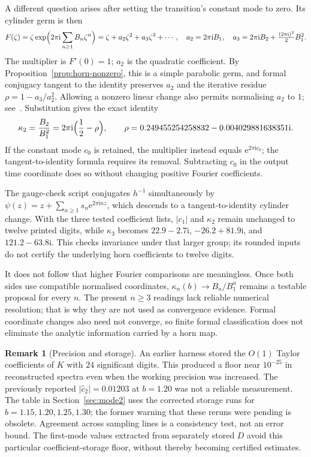 \documentclass[11pt,a4paper]{article}
\theoremstyle{definition}
\newtheorem{remark}[theorem]{Remark}
\newcommand{\Kk}{K}
\newcommand{\eee}{\mathrm{e}}
\newcommand{\ii}{\mathrm{i}}
\begin{document}
A different question arises after setting the transition's constant mode to
zero.  Its cylinder germ is then
\begin{equation}\label{eq:germzeta}
 F(\zeta)=\zeta\exp\Bigl(2\pi\ii\sum_{n\ge1}B_n\zeta^n\Bigr)
 =\zeta+a_2\zeta^2+a_3\zeta^3+\cdots,\quad
 a_2=2\pi\ii B_1,\quad
 a_3=2\pi\ii B_2+\tfrac{(2\pi\ii)^2}{2}B_1^2.
\end{equation}
The multiplier is $F'(0)=1$; $a_2$ is the quadratic coefficient.
By Proposition~\ref{prop:horn-nonzero}, this is a simple parabolic germ, and formal conjugacy tangent to the identity
preserves $a_2$ and the iterative residue $\rho=1-a_3/a_2^2$.
Allowing a nonzero linear change also permits normalising $a_2$ to $1$;
see~\cite[Definition 1 and Appendix]{BuffEpstein2002}.
Substitution gives the exact identity
\begin{equation}\label{eq:kapparho}
 \kappa_2=\frac{B_2}{B_1^2}
 =2\pi\ii\Bigl(\frac12-\rho\Bigr),\qquad
 \rho=0.249455254258832-0.004029881638351\ii.
\end{equation}
If the constant mode $c_0$ is retained, the multiplier instead equals
$\eee^{2\pi\ii c_0}$; the tangent-to-identity formula requires its removal.
Subtracting $c_0$ in the output time coordinate does so without changing
positive Fourier coefficients.

The gauge-check script conjugates $h^{-1}$ simultaneously
by $\psi(z)=z+\sum_{n\ge1}s_n\eee^{2\pi\ii nz}$, which descends to a
tangent-to-identity cylinder change.  With the three tested coefficient lists,
$|c_1|$ and $\kappa_2$ remain unchanged to twelve printed digits, while
$\kappa_3$ becomes $22.9-2.7\ii$, $-26.2+81.9\ii$, and $121.2-63.8\ii$.
This checks invariance under that larger group; its rounded inputs do not
certify the underlying horn coefficients to twelve digits.

It does not follow that higher Fourier comparisons are meaningless.
Once both sides use compatible normalised coordinates,
$\kappa_n(b)\to B_n/B_1^n$ remains a testable proposal for every $n$.
The present $n\ge3$ readings lack reliable numerical resolution; that is
why they are not used as convergence evidence.  Formal coordinate changes
also need not converge, so finite formal classification does not eliminate
the analytic information carried by a horn map.

\begin{remark}[Precision and storage]\label{rem:n2}
An earlier harness stored the $O(1)$ Taylor coefficients of $\Kk$ with
$24$ significant digits.  This produced a floor near $10^{-25}$ in
reconstructed spectra even when the working precision was increased.
The previously reported $|\hat c_2|=0.01203$ at $b=1.20$ was not a reliable
measurement.  The table in Section~\ref{sec:mode2} uses the corrected
storage runs for $b=1.15,1.20,1.25,1.30$; the former warning that these
reruns were pending is obsolete.  Agreement across sampling lines is a
consistency test, not an error bound.  The first-mode values extracted from
separately stored $D$ avoid this particular coefficient-storage floor,
without thereby becoming certified estimates.
\end{remark}
\end{document}
